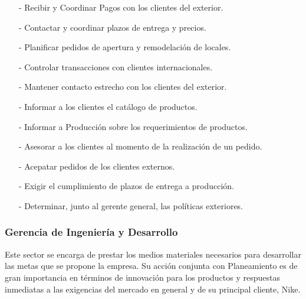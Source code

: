 \documentclass[a4paper,10pt,titlepage]{article}
\begin{document}

{
    \begin{itemize}
        \item[-] Recibir y Coordinar Pagos con los clientes del exterior.
        \item[-] Contactar y coordinar plazos de entrega y precios.
        \item[-] Planificar pedidos de apertura y remodelaci\'on de locales.
        \item[-] Controlar transacciones con clientes internacionales.
    \end{itemize}
}
{
    \begin{itemize}
        \item[-] Mantener contacto estrecho con los clientes del exterior.
        \item[-] Informar a los clientes el cat\'alogo de productos.
        \item[-] Informar a Producci\'on sobre los requerimientos de productos.
        \item[-] Asesorar a los clientes al momento de la realizaci\'on de un pedido.
	\item[-] Acepatar pedidos de los clientes externos.
    \end{itemize}
}
{
    \begin{itemize}
        \item[-] Exigir el cumplimiento de plazos de entrega a producci\'on.
        \item[-] Determinar, junto al gerente general, las pol\'iticas exteriores.
    \end{itemize}
}


\newpage

\subsubsection{Gerencia de Ingenier\'ia y Desarrollo}
\smallskip
Este sector se encarga de prestar los medios materiales necesarios para desarrollar las metas que se propone la empresa. 
Su acci\'on conjunta con Planeamiento es de gran importancia en t\'erminos de innovaci\'on para los productos y respuestas inmediatas a las exigencias 
del mercado en general y de su principal cliente, Nike.
\end{document}
